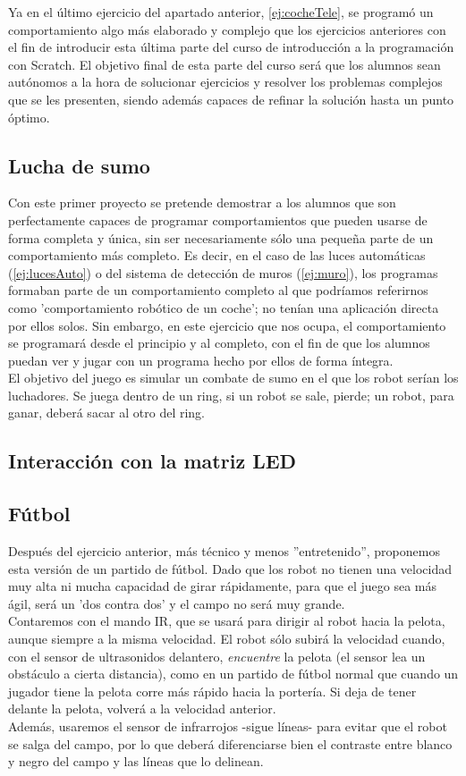 Ya en el último ejercicio del apartado anterior, \ref{ej:cocheTele}, se programó un comportamiento algo más elaborado y complejo que los ejercicios anteriores con el fin de introducir esta última parte del curso de introducción a la programación con Scratch. El objetivo final de esta parte del curso será que los alumnos sean autónomos a la hora de solucionar ejercicios y resolver los problemas complejos que se les presenten, siendo además capaces de refinar la solución hasta un punto óptimo. 

\subsection{Lucha de sumo}
Con este primer proyecto se pretende demostrar a los alumnos que son perfectamente capaces de programar comportamientos que pueden usarse de forma completa y única, sin ser necesariamente sólo una pequeña parte de un comportamiento más completo. Es decir, en el caso de las luces automáticas (\ref{ej:lucesAuto}) o del sistema de detección de muros (\ref{ej:muro}), los programas formaban parte de un comportamiento completo al que podríamos referirnos como 'comportamiento robótico de un coche'; no tenían una aplicación directa por ellos solos. Sin embargo, en este ejercicio que nos ocupa, el comportamiento se programará desde el principio y al completo, con el fin de que los alumnos puedan ver y jugar con un programa hecho por ellos de forma íntegra. \\
El objetivo del juego es simular un combate de sumo en el que los robot serían los luchadores. Se juega dentro de un ring, si un robot se sale, pierde; un robot, para ganar, deberá sacar al otro del ring.

\subsection{Interacción con la matriz LED}

\label{key}
\subsection{Fútbol}
Después del ejercicio anterior, más técnico y menos ''entretenido'', proponemos esta versión de un partido de fútbol. Dado que los robot no tienen una velocidad muy alta ni mucha capacidad de girar rápidamente, para que el juego sea más ágil, será un 'dos contra dos' y el campo no será muy grande. \\
Contaremos con el mando IR, que se usará para dirigir al robot hacia la pelota, aunque siempre a la misma velocidad. El robot sólo subirá la velocidad cuando, con el sensor de ultrasonidos delantero, \textit{encuentre} la pelota (el sensor lea un obstáculo a cierta distancia), como en un partido de fútbol normal que cuando un jugador tiene la pelota corre más rápido hacia la portería. Si deja de tener delante la pelota, volverá a la velocidad anterior. \\
Además, usaremos el sensor de infrarrojos -sigue líneas- para evitar que el robot se salga del campo, por lo que deberá diferenciarse bien el contraste entre blanco y negro del campo y las líneas que lo delinean. \\

